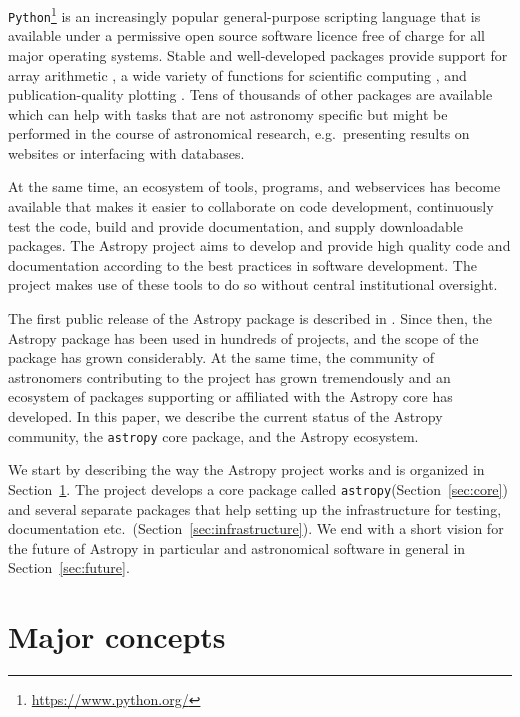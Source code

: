 \documentclass[modern]{aastex61}
\newcommand{\package}[1]{\texttt{#1}\xspace}
\newcommand{\python}{\package{Python}}
\newcommand{\astropy}{Astropy\xspace}
\newcommand{\astropypkg}{\package{astropy}}
\newcommand{\sectionname}{Section\xspace}
\begin{document}
\python\footnote{\url{https://www.python.org/}} is an increasingly popular
general-purpose scripting language that is available under a permissive open
source software licence free of charge for all major operating systems. Stable
and well-developed packages provide support for array arithmetic
\citep[\package{numpy},][]{numpy}, a wide variety of functions for scientific
computing \citep[\package{scipy},][]{numpy}, and publication-quality plotting
\citep[\package{matplotlib},][]{matplotlib}. Tens of thousands of other packages
are available which can help with tasks that are not astronomy specific but
might be performed in the course of astronomical research, e.g.\ presenting
results on websites or interfacing with databases.

At the same time, an ecosystem of tools, programs, and webservices
has become available that makes it easier to collaborate on code development,
continuously test the code, build and provide documentation, and
supply downloadable packages. The \astropy project aims to develop and
provide high quality code and documentation according to the best
practices in software development. The project makes use of these
tools to do so without central institutional oversight.

The first public release of the \astropy package is described in
\cite{astropy}. Since then, the \astropy package has been
used in hundreds of projects, and the scope of the package has grown
considerably. At the same time, the community of astronomers
contributing to the project has grown tremendously and an ecosystem
of packages supporting or affiliated with the \astropy core has
developed. In this paper, we describe the current status of the
\astropy community, the \astropypkg core package, and the \astropy
ecosystem.

We start by describing the way the \astropy project works and is
organized in \sectionname~\ref{sec:concepts}.  The project develops a core
package called \astropypkg (\sectionname~\ref{sec:core}) and several
separate packages that help setting up the infrastructure for testing,
documentation etc.\ (\sectionname~\ref{sec:infrastructure}).
We end with a short vision for
the future of \astropy in particular and astronomical software in general
in \sectionname~\ref{sec:future}.


\section{Major concepts}
\label{sec:concepts}
\end{document}
